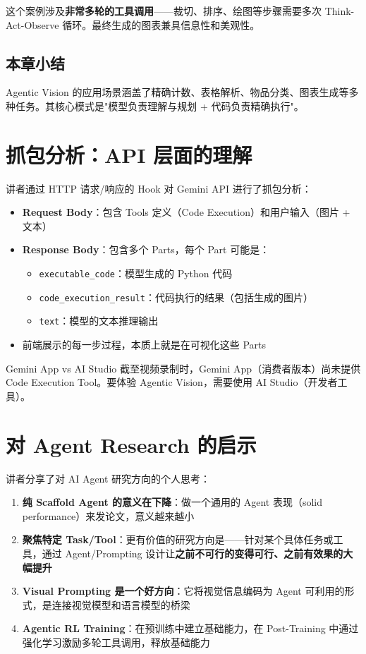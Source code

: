 \documentclass[a4paper]{article}
\begin{document}
这个案例涉及\textbf{非常多轮的工具调用}——裁切、排序、绘图等步骤需要多次 Think-Act-Observe 循环。最终生成的图表兼具信息性和美观性。

\subsection{本章小结}

Agentic Vision 的应用场景涵盖了精确计数、表格解析、物品分类、图表生成等多种任务。其核心模式是"模型负责理解与规划 + 代码负责精确执行"。


\section{抓包分析：API 层面的理解}

讲者通过 HTTP 请求/响应的 Hook 对 Gemini API 进行了抓包分析：

\begin{itemize}
    \item \textbf{Request Body}：包含 Tools 定义（Code Execution）和用户输入（图片 + 文本）
    \item \textbf{Response Body}：包含多个 Parts，每个 Part 可能是：
    \begin{itemize}
        \item \texttt{executable\_code}：模型生成的 Python 代码
        \item \texttt{code\_execution\_result}：代码执行的结果（包括生成的图片）
        \item \texttt{text}：模型的文本推理输出
    \end{itemize}
    \item 前端展示的每一步过程，本质上就是在可视化这些 Parts
\end{itemize}

\begin{knowledgebox}{Gemini App vs AI Studio}
截至视频录制时，Gemini App（消费者版本）尚未提供 Code Execution Tool。要体验 Agentic Vision，需要使用 AI Studio（开发者工具）。
\end{knowledgebox}


\section{对 Agent Research 的启示}

讲者分享了对 AI Agent 研究方向的个人思考：

\begin{enumerate}
    \item \textbf{纯 Scaffold Agent 的意义在下降}：做一个通用的 Agent 表现（solid performance）来发论文，意义越来越小
    \item \textbf{聚焦特定 Task/Tool}：更有价值的研究方向是——针对某个具体任务或工具，通过 Agent/Prompting 设计让\textbf{之前不可行的变得可行、之前有效果的大幅提升}
    \item \textbf{Visual Prompting 是一个好方向}：它将视觉信息编码为 Agent 可利用的形式，是连接视觉模型和语言模型的桥梁
    \item \textbf{Agentic RL Training}：在预训练中建立基础能力，在 Post-Training 中通过强化学习激励多轮工具调用，释放基础能力
\end{enumerate}
\end{document}
